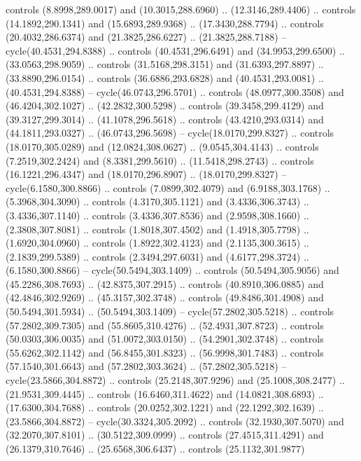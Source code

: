 \begin{scope}[cm={{1.25,0.0,0.0,-1.25,(0.0,743.43331)}}]
    controls (8.8998,289.0017) and (10.3015,288.6960) .. (12.3146,289.4406) ..
    controls (14.1892,290.1341) and (15.6893,289.9368) .. (17.3430,288.7794) ..
    controls (20.4032,286.6374) and (21.3825,286.6227) .. (21.3825,288.7188) --
    cycle(40.4531,294.8388) .. controls (40.4531,296.6491) and (34.9953,299.6500)
    .. (33.0563,298.9059) .. controls (31.5168,298.3151) and (31.6393,297.8897) ..
    (33.8890,296.0154) .. controls (36.6886,293.6828) and (40.4531,293.0081) ..
    (40.4531,294.8388) -- cycle(46.0743,296.5701) .. controls (48.0977,300.3508)
    and (46.4204,302.1027) .. (42.2832,300.5298) .. controls (39.3458,299.4129)
    and (39.3127,299.3014) .. (41.1078,296.5618) .. controls (43.4210,293.0314)
    and (44.1811,293.0327) .. (46.0743,296.5698) -- cycle(18.0170,299.8327) ..
    controls (18.0170,305.0289) and (12.0824,308.0627) .. (9.0545,304.4143) ..
    controls (7.2519,302.2424) and (8.3381,299.5610) .. (11.5418,298.2743) ..
    controls (16.1221,296.4347) and (18.0170,296.8907) .. (18.0170,299.8327) --
    cycle(6.1580,300.8866) .. controls (7.0899,302.4079) and (6.9188,303.1768) ..
    (5.3968,304.3090) .. controls (4.3170,305.1121) and (3.4336,306.3743) ..
    (3.4336,307.1140) .. controls (3.4336,307.8536) and (2.9598,308.1660) ..
    (2.3808,307.8081) .. controls (1.8018,307.4502) and (1.4918,305.7798) ..
    (1.6920,304.0960) .. controls (1.8922,302.4123) and (2.1135,300.3615) ..
    (2.1839,299.5389) .. controls (2.3494,297.6031) and (4.6177,298.3724) ..
    (6.1580,300.8866) -- cycle(50.5494,303.1409) .. controls (50.5494,305.9056)
    and (45.2286,308.7693) .. (42.8375,307.2915) .. controls (40.8910,306.0885)
    and (42.4846,302.9269) .. (45.3157,302.3748) .. controls (49.8486,301.4908)
    and (50.5494,301.5934) .. (50.5494,303.1409) -- cycle(57.2802,305.5218) ..
    controls (57.2802,309.7305) and (55.8605,310.4276) .. (52.4931,307.8723) ..
    controls (50.0303,306.0035) and (51.0072,303.0150) .. (54.2901,302.3748) ..
    controls (55.6262,302.1142) and (56.8455,301.8323) .. (56.9998,301.7483) ..
    controls (57.1540,301.6643) and (57.2802,303.3624) .. (57.2802,305.5218) --
    cycle(23.5866,304.8872) .. controls (25.2148,307.9296) and (25.1008,308.2477)
    .. (21.9531,309.4445) .. controls (16.6460,311.4622) and (14.0821,308.6893) ..
    (17.6300,304.7688) .. controls (20.0252,302.1221) and (22.1292,302.1639) ..
    (23.5866,304.8872) -- cycle(30.3324,305.2092) .. controls (32.1930,307.5070)
    and (32.2070,307.8101) .. (30.5122,309.0999) .. controls (27.4515,311.4291)
    and (26.1379,310.7646) .. (25.6568,306.6437) .. controls (25.1132,301.9877)

\end{scope}

